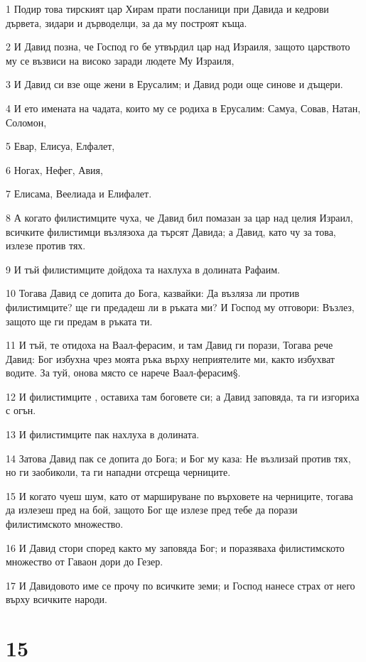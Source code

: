\par 1 Подир това тирският цар Хирам прати посланици при Давида и кедрови дървета, зидари и дърводелци, за да му построят къща.
\par 2 И Давид позна, че Господ го бе утвърдил цар над Израиля, защото царството му се възвиси на високо заради людете Му Израиля,
\par 3 И Давид си взе още жени в Ерусалим; и Давид роди още синове и дъщери.
\par 4 И ето имената на чадата, които му се родиха в Ерусалим: Самуа, Совав, Натан, Соломон,
\par 5 Евар, Елисуа, Елфалет,
\par 6 Ногах, Нефег, Авия,
\par 7 Елисама, Веелиада и Елифалет.
\par 8 А когато филистимците чуха, че Давид бил помазан за цар над целия Израил, всичките филистимци възлязоха да търсят Давида; а Давид, като чу за това, излезе против тях.
\par 9 И тъй филистимците дойдоха та нахлуха в долината Рафаим.
\par 10 Тогава Давид се допита до Бога, казвайки: Да възляза ли против филистимците? ще ги предадеш ли в ръката ми? И Господ му отговори: Възлез, защото ще ги предам в ръката ти.
\par 11 И тъй, те отидоха на Ваал-ферасим, и там Давид ги порази, Тогава рече Давид: Бог избухна чрез моята ръка върху неприятелите ми, както избухват водите. За туй, онова място се нарече Ваал-ферасим§.
\par 12 И филистимците , оставиха там боговете си; а Давид заповяда, та ги изгориха с огън.
\par 13 И филистимците пак нахлуха в долината.
\par 14 Затова Давид пак се допита до Бога; и Бог му каза: Не възлизай против тях, но ги заобиколи, та ги нападни отсреща черниците.
\par 15 И когато чуеш шум, като от маршируване по върховете на черниците, тогава да излезеш пред на бой, защото Бог ще излезе пред тебе да порази филистимското множество.
\par 16 И Давид стори според както му заповяда Бог; и поразяваха филистимското множество от Гаваон дори до Гезер.
\par 17 И Давидовото име се прочу по всичките земи; и Господ нанесе страх от него върху всичките народи.

\chapter{15}

